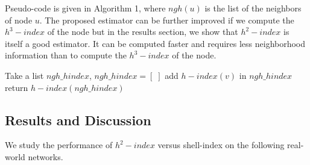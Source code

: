 \documentclass[12pt,3p]{article}
\begin{document}
Pseudo-code is given in Algorithm 1, where $ngh(u)$ is the list of the neighbors of node $u$. The proposed estimator can be further improved if we compute the $h^3-index$ of the node but in the results section, we show that $h^2-index$ is itself a good estimator. It can be computed faster and requires less neighborhood information than to compute the $h^3-index$ of the node.
 

\begin{algorithm}
\caption{$Compute\_h^2-index(G,u)$}%
\begin{algorithmic}
\STATE Take a list $ngh\_hindex$, $ngh\_hindex=[\; ]$
\STATE add $h-index(v)$ in $ngh\_hindex$
\ENDFOR
\STATE return $h-index(ngh\_hindex)$
\end{algorithmic}
\end{algorithm}


\subsection{Results and Discussion}

We study the performance of $h^2-index$ versus shell-index on the following real-world networks. 
\end{document}
